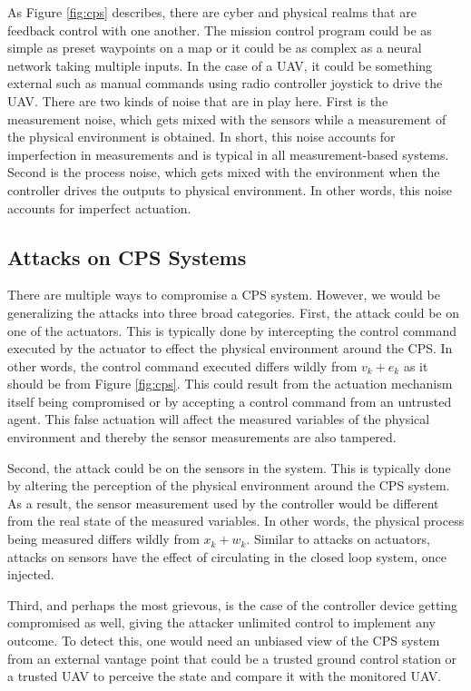 As Figure \ref{fig:cps} describes, there are cyber and physical realms that are feedback control with one another. The mission control program could be as simple as preset waypoints on a map or it could be as complex as a neural network taking multiple inputs. In the case of a UAV, it could be something external such as manual commands using radio controller joystick to drive the UAV.  There are two kinds of noise that are in play here. First is the measurement noise, which gets mixed with the sensors while a measurement of the physical environment is obtained. In short, this noise accounts for imperfection in measurements and is typical in all measurement-based systems. Second is the process noise, which gets mixed with the environment when the controller drives the outputs to physical environment. In other words, this noise accounts for imperfect actuation.

\subsection{Attacks on CPS Systems}
There are multiple ways to compromise a CPS system. However, we would be generalizing the attacks into three broad categories. First, the attack could be on one of the actuators. This is typically done by intercepting the control command executed by the actuator to effect the physical environment around the CPS. In other words, the control command executed differs wildly from $v_k + e_k$ as it should be from Figure \ref{fig:cps}. This could result from the actuation mechanism itself being compromised or by accepting a control command from an untrusted agent. This false actuation will affect the measured variables of the physical environment and thereby the sensor measurements are also tampered.

Second, the attack could be on the sensors in the system. This is typically done by altering the perception of the physical environment around the CPS system. As a result, the sensor measurement used by the controller would be different from the real state of the measured variables. In other words, the physical process being measured differs wildly from $x_k + w_k$. Similar to attacks on actuators, attacks on sensors have the effect of circulating in the closed loop system, once injected.

Third, and perhaps the most grievous, is the case of the controller device getting compromised as well, giving the attacker unlimited control to implement any outcome. To detect this, one would need an unbiased view of the CPS system from an external vantage point that could be a trusted ground control station or a trusted UAV to perceive the state and compare it with the monitored UAV. 

